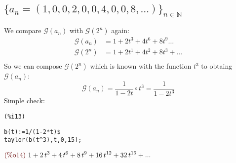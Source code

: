 \subsection{$\{a_n = (1,0,0,2,0,0,4,0,0,8,\ldots)\}_{n\in \mathbb{N} }$}

We compare $\mathcal{G}(a_n) $ with $\mathcal{G} (2^n)$ again:
\begin{displaymath}
  \begin{split}
    \mathcal{G} (a_n) &= 1 + 2t^3 + 4t^6 + 8t^9\ldots \\
    \mathcal{G} (2^n) &= 1 + 2t^1 + 4t^2 + 8t^3 + \ldots \\
  \end{split}
\end{displaymath}
So we can compose $\mathcal{G} (2^n)$ which is known with the function
$t^3$ to obtaing $\mathcal{G} (a_n)$:
\begin{displaymath}
  \mathcal{G} (a_n) =  \frac{1}{1-2t} \circ t^3 =  \frac{1}{1-2t^3} 
\end{displaymath}
Simple check:

\noindent
\begin{minipage}[t]{8ex}{\color{red}\bf
\begin{verbatim}
(%i13) 
\end{verbatim}}
\end{minipage}
\begin{minipage}[t]{\textwidth}{\color{blue}
\begin{verbatim}
b(t):=1/(1-2*t)$
taylor(b(t^3),t,0,15);
\end{verbatim}}
\end{minipage}
\begin{math}\displaystyle
\parbox{8ex}{\color{labelcolor}(\%o14) }
1+2\,{t}^{3}+4\,{t}^{6}+8\,{t}^{9}+16\,{t}^{12}+32\,{t}^{15}+...
\end{math}




